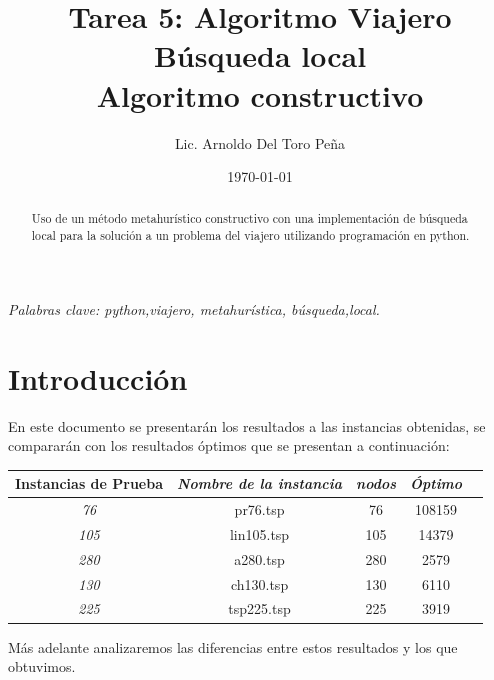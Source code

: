 \documentclass[12pt,a4paper]{article}
\author{Lic. Arnoldo Del Toro Peña}
\title{Tarea 5: Algoritmo Viajero \\ Búsqueda local \\ \tiny{Algoritmo constructivo}}
\date{\today}
\begin{document}
\maketitle



\thispagestyle{empty}
\begin{abstract}
    Uso de un método metahurístico constructivo con una implementación de búsqueda local para la solución a un problema del viajero utilizando programación en python.
\end{abstract}
{\centering \textit{Palabras clave: python,viajero, metahurística, búsqueda,local.}}
\section{Introducción}
En este documento se presentarán los resultados a las instancias obtenidas, se compararán con los resultados óptimos que se presentan a continuación:
\begin{table}[h!]
\centering
\begin{tabular}{|c|c|c|c|c|}
\hline
\multicolumn{1}{|l|}{\textbf{Instancias de Prueba}} & \multicolumn{1}{l|}{\textit{Nombre de la instancia}}  & \multicolumn{1}{c|}{\textit{nodos}} & \textit{Óptimo} \\ \hline
\textit{76}                                          &  pr76.tsp                                & 76                            & 108159            \\ \hline
\textit{105}                                          & lin105.tsp                                 & 105                            & 14379             \\ \hline
\textit{280}                                          & a280.tsp                                 & 280                           &2579            \\ \hline
\textit{130}                                          & ch130.tsp                                 & 130                            & 6110             \\ \hline
\textit{225}                                          & tsp225.tsp                                 & 225                            & 3919             \\ \hline

\end{tabular}
\end{table}

Más adelante analizaremos las diferencias entre estos resultados y los que obtuvimos.
\end{document}
